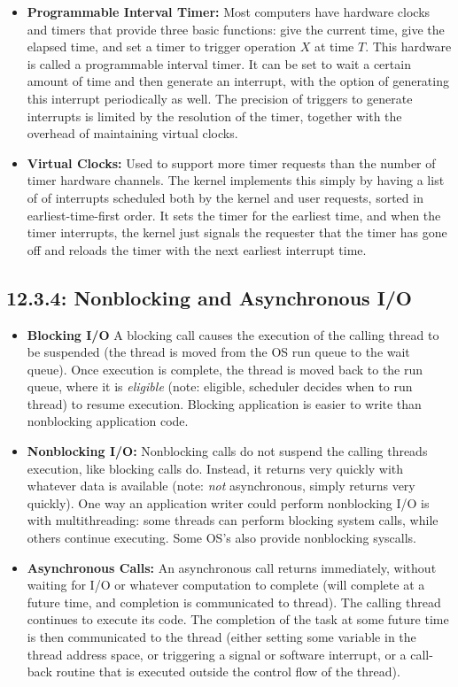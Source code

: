 \documentclass[12pt]{article}
\begin{document}
\begin{itemize}
    \item \textbf{Programmable Interval Timer:} Most computers have hardware clocks and timers that provide three basic functions: give the current time, give the elapsed time, and set a timer to trigger operation \(X\) at time \(T\). This hardware is called a programmable interval timer. It can be set to wait a certain amount of time and then generate an interrupt, with the option of generating this interrupt periodically as well. The precision of triggers to generate interrupts is limited by the resolution of the timer, together with the overhead of maintaining virtual clocks.
    \item \textbf{Virtual Clocks:} Used to support more timer requests than the number of timer hardware channels. The kernel implements this simply by having a list of of interrupts scheduled both by the kernel and user requests, sorted in earliest-time-first order. It sets the timer for the earliest time, and when the timer interrupts, the kernel just signals the requester that the timer has gone off and reloads the timer with the next earliest interrupt time.
\end{itemize}

\subsection*{12.3.4: Nonblocking and Asynchronous I/O}

\begin{itemize}
    \item \textbf{Blocking I/O} A blocking call causes the execution of the calling thread to be suspended (the thread is moved from the OS run queue to the wait queue). Once execution is complete, the thread is moved back to the run queue, where it is \textit{eligible} (note: eligible, scheduler decides when to run thread) to resume execution. Blocking application is easier to write than nonblocking application code.
    \item \textbf{Nonblocking I/O:} Nonblocking calls do not suspend the calling threads execution, like blocking calls do. Instead, it returns very quickly with whatever data is available (note: \textit{not} asynchronous, simply returns very quickly). One way an application writer could perform nonblocking I/O is with multithreading: some threads can perform blocking system calls, while others continue executing. Some OS's also provide nonblocking syscalls.
    \item \textbf{Asynchronous Calls:} An asynchronous call returns immediately, without waiting for I/O or whatever computation to complete (will complete at a future time, and completion is communicated to thread). The calling thread continues to execute its code. The completion of the task at some future time is then communicated to the thread (either setting some variable in the thread address space, or triggering a signal or software interrupt, or a call-back routine that is executed outside the control flow of the thread).
\end{itemize}
\end{document}
